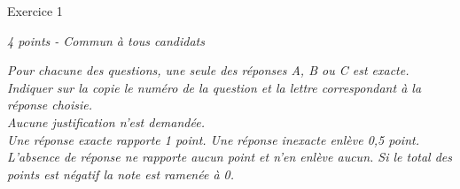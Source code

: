 
%
\begin{h2}Exercice 1\end{h2}
\textit{4 points - Commun à tous candidats }
\par
\textit{Pour chacune des questions, une seule des réponses A,  B ou C est exacte. Indiquer sur la copie le numéro de la question et la lettre correspondant à la réponse choisie. 
\\
Aucune justification n'est demandée. 
\\
Une réponse exacte rapporte 1 point. Une réponse inexacte enlève 0,5 point. L'absence de réponse ne rapporte aucun point et n'en enlève aucun. Si le total des points est négatif la note est ramenée à 0.}
\par
